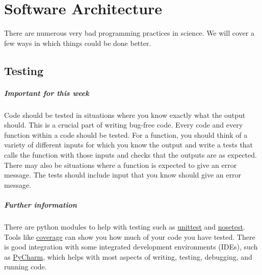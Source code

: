 
\chapter{Software Architecture}

There are numerous very bad programming practices in science. We will
cover a few ways in which things could be done better. 



\section{Testing\label{sec:testing}}

\paragraph*{Important for this week}

Code should be tested in situations where you know exactly what the
output should. This is a crucial part of writing bug-free code. Every
code and every function within a code should be tested. For a function,
you should think of a variety of different inputs for which you know
the output and write a tests that calls the function with those inputs
and checks that the outputs are as expected. There may also be situations
where a function is expected to give an error message. The tests should
include input that you know should give an error message.

\paragraph*{Further information}

There are python modules to help with testing such as \url{unittest}
and \url{nosetest}. Tools like \url{coverage} can show you how much
of your code you have tested. There is good integration with some
integrated development environments (IDEs), such as \url{PyCharm},
which helps with most aspects of writing, testing, debugging, and
running code. 

\clearpage{}

